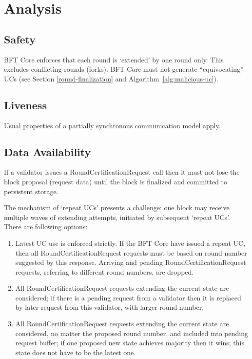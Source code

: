 \section{Analysis}

\subsection{Safety}
BFT Core enforces that each round is `extended' by one round only. This excludes conflicting rounds (forks). BFT Core must not generate ``equivocating'' UCs (see Section \ref{round-finalization} and Algorithm~\ref{alg:malicious-uc}).

\subsection{Liveness}
Usual properties of a partially synchronous communication model apply.

\subsection{Data Availability}
If a validator issues a RoundCertificationRequest call then it must not lose the block proposal (request data) until the block is finalized and committed to persistent storage.

The mechanism of `repeat UCs' presents a challenge: one block may receive multiple waves of extending attempts, initiated by subsequent `repeat UCs'. There are following options:
\begin{enumerate}
  \item Latest UC use is enforced strictly. If the BFT Core have issued a repeat UC, then all RoundCertificationRequest requests must be based on round number suggested by this response. Arriving and pending RoundCertificationRequest requests, referring to different round numbers, are dropped.
  \item All RoundCertificationRequest requests extending the current state are considered; if there is a pending request from a validator then it is replaced by later request from this validator, with larger round number.
  \item All RoundCertificationRequest requests extending the current state are considered, no matter the proposed round number, and included into pending request buffer; if one proposed new state achieves majority then it wins; this state does not have to be the latest one.
\end{enumerate}

